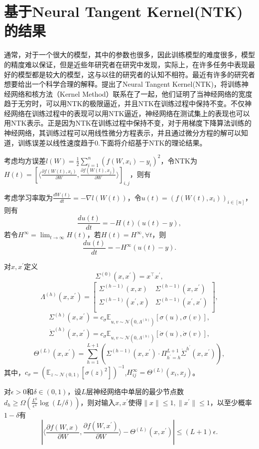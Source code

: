 \section{基于Neural Tangent Kernel(NTK)的结果}
通常，对于一个很大的模型，其中的参数也很多，因此训练模型的难度很多，模型的精度难以保证，但是近些年研究者在研究中发现，实际上，在许多任务中表现最好的模型都是较大的模型，这与以往的研究者的认知不相符。最近有许多的研究者想要给出一个科学合理的解释。\citet{jacot2018neural}提出了Neural Tangent Kernel(NTK)，将训练神经网络和核方法（Kernel Method）联系在了一起，他们证明了当神经网络的宽度趋于无穷时，可以用NTK的极限逼近，并且NTK在训练过程中保持不变。不仅神经网络在训练过程中的表现可以用NTK逼近，神经网络在测试集上的表现也可以用NTK表示。正是因为NTK在训练过程中保持不变，对于用梯度下降算法训练的神经网络，其训练过程可以用线性微分方程表示，并且通过微分方程的解可以知道，训练误差以线性速度趋于0.下面将介绍基于NTK的理论结果。
\par
考虑均方误差$l(W) = \frac{1}{2}\sum_{i=1}^n (f(W,x_i)-y_i)^2$，令NTK为$H(t) = [\langle \frac{\partial f(W(t),x_i)}{\partial W},\frac{\partial f(W(t),x_j)}{\partial W} \rangle ]_{i,j}$，则有
\begin{lemma}
考虑学习率取为$\frac{d W(t)}{d t} = -\nabla l(W(t))$，令$u(t) = (f(W(t),x_i))_{i\in[n]}$，则有
\[
\frac{du(t)}{dt} = - H(t) (u(t)-y),
\]
若令$H^\infty = \lim_{t\rightarrow \infty} H(t)$，若$H(t) = H^\infty, \forall t$，则
\[
\frac{du(t)}{dt} = - H^\infty (u(t)-y).
\]
\end{lemma}
\par
对$x,x^\prime$定义
\[
\Sigma^{(0)}(x,x^\prime) = x^\top x^\prime,
\]
\[
\Lambda^{(h)}(x,x^\prime) = \begin{bmatrix}
							\Sigma^{(h-1)}(x,x) & \Sigma^{(h-1)}(x,x^\prime)\\
							\Sigma^{(h-1)}(x^\prime,x) & \Sigma^{(h-1)}(x^\prime,x^\prime)\\
							\end{bmatrix},
\]
\[
\Sigma^{(h)}(x,x^\prime) = c_\sigma \mathbb{E}_{u,v\sim \mathcal{N}(0,\Lambda^{(h)})}[\sigma(u),\sigma(v)],
\]
\[
\dot{\Sigma}^{(h)}(x,x^\prime) = c_\sigma \mathbb{E}_{u,v\sim \mathcal{N}(0,\Lambda^{(h)})}[\dot{\sigma}(u),\dot{\sigma}(v)],
\]
\[
\Theta^{(L)}(x,x^\prime) = \sum_{h=1}^{L+1}(\Sigma^{(h-1)}(x,x^\prime)\cdot \Pi_{h^\prime = h}^{L+1}\dot{\Sigma}^{h^\prime}(x,x^\prime)),
\]
其中，$c_\sigma = (\mathbb{E}_{z\sim\mathcal{N}(0,1)}[\sigma(z)^2])^{-1}$,$H^\infty_{ij} = \Theta^{(L)}(x_i,x_j)$。
\begin{theorem}
对$\epsilon > 0$和$\delta\in(0,1)$，设$L$层神经网络中单层的最少节点数$d_h \geq \Omega(\frac{L^6}{\epsilon^4}\log(L/\delta))$，则对输入$x,x^\prime$使得$\|x\|\leq 1, \|x^\prime \| \leq 1$，以至少概率$1-\delta$有
\[
|\langle \frac{\partial f(W,x)}{\partial W},\frac{\partial f(W,x^\prime)}{\partial W}\rangle - \Theta^{(L)}(x,x^\prime)| \leq (L+1)\epsilon.
\]
\end{theorem}
